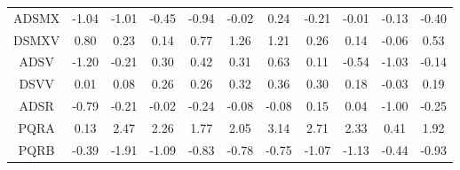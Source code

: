 \documentclass[11pt,a4paper]{report}
\begin{document}
\begin{longtable}{ | c || c | c | c | c | c | c | c | c | c || c |}
ADSMX &  \cellcolor[HTML]{FFE7E7} -1.04 &  \cellcolor[HTML]{FFE7E7} -1.01 &  \cellcolor[HTML]{FFF7F7} -0.45 &  \cellcolor[HTML]{FFE7E7} -0.94 &  \cellcolor[HTML]{FFFFFF} -0.02 &  \cellcolor[HTML]{F7F7FF} 0.24 &  \cellcolor[HTML]{FFF7F7} -0.21 &  \cellcolor[HTML]{FFFFFF} -0.01 &  \cellcolor[HTML]{FFFFFF} -0.13 &  \cellcolor[HTML]{FFF7F7} -0.40 \\
DSMXV &  \cellcolor[HTML]{E7E7FF} 0.80 &  \cellcolor[HTML]{F7F7FF} 0.23 &  \cellcolor[HTML]{FFFFFF} 0.14 &  \cellcolor[HTML]{EFEFFF} 0.77 &  \cellcolor[HTML]{DFDFFF} 1.26 &  \cellcolor[HTML]{DFDFFF} 1.21 &  \cellcolor[HTML]{F7F7FF} 0.26 &  \cellcolor[HTML]{FFFFFF} 0.14 &  \cellcolor[HTML]{FFFFFF} -0.06 &  \cellcolor[HTML]{EFEFFF} 0.53 \\
ADSV &  \cellcolor[HTML]{FFDFDF} -1.20 &  \cellcolor[HTML]{FFF7F7} -0.21 &  \cellcolor[HTML]{F7F7FF} 0.30 &  \cellcolor[HTML]{F7F7FF} 0.42 &  \cellcolor[HTML]{F7F7FF} 0.31 &  \cellcolor[HTML]{EFEFFF} 0.63 &  \cellcolor[HTML]{FFFFFF} 0.11 &  \cellcolor[HTML]{FFEFEF} -0.54 &  \cellcolor[HTML]{FFE7E7} -1.03 &  \cellcolor[HTML]{FFFFFF} -0.14 \\
DSVV &  \cellcolor[HTML]{FFFFFF} 0.01 &  \cellcolor[HTML]{FFFFFF} 0.08 &  \cellcolor[HTML]{F7F7FF} 0.26 &  \cellcolor[HTML]{F7F7FF} 0.26 &  \cellcolor[HTML]{F7F7FF} 0.32 &  \cellcolor[HTML]{F7F7FF} 0.36 &  \cellcolor[HTML]{F7F7FF} 0.30 &  \cellcolor[HTML]{F7F7FF} 0.18 &  \cellcolor[HTML]{FFFFFF} -0.03 &  \cellcolor[HTML]{F7F7FF} 0.19 \\
ADSR &  \cellcolor[HTML]{FFEFEF} -0.79 &  \cellcolor[HTML]{FFF7F7} -0.21 &  \cellcolor[HTML]{FFFFFF} -0.02 &  \cellcolor[HTML]{FFF7F7} -0.24 &  \cellcolor[HTML]{FFFFFF} -0.08 &  \cellcolor[HTML]{FFFFFF} -0.08 &  \cellcolor[HTML]{FFFFFF} 0.15 &  \cellcolor[HTML]{FFFFFF} 0.04 &  \cellcolor[HTML]{FFE7E7} -1.00 &  \cellcolor[HTML]{FFF7F7} -0.25 \\
PQRA &  \cellcolor[HTML]{FFFFFF} 0.13 &  \cellcolor[HTML]{BFBFFF} 2.47 &  \cellcolor[HTML]{C7C7FF} 2.26 &  \cellcolor[HTML]{CFCFFF} 1.77 &  \cellcolor[HTML]{CFCFFF} 2.05 &  \cellcolor[HTML]{AFAFFF} 3.14 &  \cellcolor[HTML]{B7B7FF} 2.71 &  \cellcolor[HTML]{C7C7FF} 2.33 &  \cellcolor[HTML]{F7F7FF} 0.41 &  \cellcolor[HTML]{CFCFFF} 1.92 \\
PQRB &  \cellcolor[HTML]{FFF7F7} -0.39 &  \cellcolor[HTML]{FFCFCF} -1.91 &  \cellcolor[HTML]{FFE7E7} -1.09 &  \cellcolor[HTML]{FFE7E7} -0.83 &  \cellcolor[HTML]{FFEFEF} -0.78 &  \cellcolor[HTML]{FFEFEF} -0.75 &  \cellcolor[HTML]{FFE7E7} -1.07 &  \cellcolor[HTML]{FFDFDF} -1.13 &  \cellcolor[HTML]{FFF7F7} -0.44 &  \cellcolor[HTML]{FFE7E7} -0.93 \\

\end{longtable}
\end{document}
